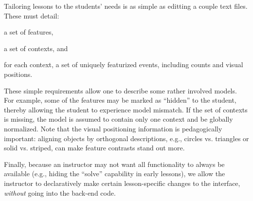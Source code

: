 \documentclass[11pt,letterpaper]{article}
\newcommand{\Note}[1]{}
\renewcommand{\Note}[1]{\hl{[#1]}}
\newcommand{\NoteSigned}[3]{{\sethlcolor{#2}\Note{#1: #3}}}
\newcommand{\NoteFF}[1]{\NoteSigned{FF}{LightBlue}{#1}}
\begin{document}
Tailoring lessons to the students' needs is as simple as editting a couple text files. These must detail:
\begin{inparaenum}[(1)]
\item a set of features, 
\item a set of contexts, and
\item for each context, a set of uniquely featurized events, including counts and visual positions.
\end{inparaenum}
These simple requirements allow one to describe some rather involved models. For example, some of 
the features may be marked as ``hidden'' to the student, thereby allowing the student to experience 
model mismatch. If the set of contexts is missing, the model is assumed to contain only 
one context and be globally normalized. Note that the visual positioning information is pedagogically 
important: aligning objects by orthogonal descriptions, e.g., circles vs. triangles or solid vs. striped, 
can make feature contrasts stand out more.

Finally, because an instructor may not want all functionality to always be available (e.g., hiding the ``solve''
capability in early lessons), we allow the instructor to declaratively make certain lesson-specific changes to 
the interface, \textit{without} going into the back-end code. 

%

\end{document}
